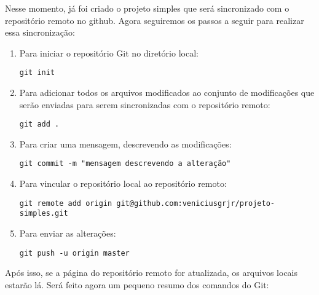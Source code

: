 Nesse momento, já foi criado o projeto simples que será 
sincronizado com o repositório remoto no github. Agora 
seguiremos os passos a seguir para realizar essa sincronização:
\begin{enumerate}
   \item Para iniciar o repositório Git no diretório local:
      \begin{lstlisting}
git init
      \end{lstlisting}
      
   \item Para adicionar todos os arquivos modificados ao 
   conjunto de modificações que serão enviadas para serem 
   sincronizadas com o repositório remoto: 
      \begin{lstlisting}
git add . 
      \end{lstlisting}
   
   \item Para criar uma mensagem, descrevendo as modificações: 
      \begin{lstlisting}
git commit -m "mensagem descrevendo a alteração"
      \end{lstlisting}
      
   \item Para vincular o repositório local ao repositório remoto: 
      \begin{lstlisting}
git remote add origin git@github.com:veniciusgrjr/projeto-simples.git
      \end{lstlisting}
      
    \item Para enviar as alterações: 
      \begin{lstlisting}
git push -u origin master
      \end{lstlisting}
 \end{enumerate}
Após isso, se a página do repositório remoto for atualizada, os 
arquivos locais estarão lá. Será feito agora um pequeno resumo 
dos comandos do Git:
